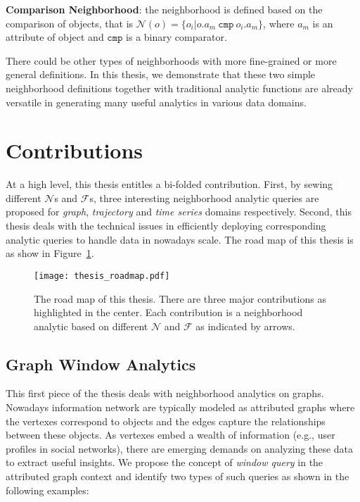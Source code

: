 \textbf{Comparison Neighborhood}: the neighborhood is defined based on the comparison of objects, that is $\mathcal{N}(o) = \{o_i | o.a_m \ \mathtt{cmp} \ o_i.a_m\}$, where $a_m$ is an attribute of object
and $\mathtt{cmp}$ is a binary comparator.

There could be other types of neighborhoods with more fine-grained or more general definitions. In this thesis, we demonstrate
that these two simple neighborhood definitions
together with traditional analytic functions are already versatile in generating many useful analytics in various data domains.

\section{Contributions}
At a high level, this thesis entitles a bi-folded contribution.
First, by
sewing different $\mathcal{N}$s and $\mathcal{F}$s, three interesting
neighborhood analytic queries are proposed for \emph{graph}, \emph{trajectory}
and \emph{time series} domains respectively. Second, this thesis
deals with the technical issues in efficiently deploying corresponding analytic queries to
handle data in nowadays scale.
The road map of this thesis is as show in Figure~\ref{fig:thesis_roadmap}.
\begin{figure}[h]
\centering
\texttt{[image: thesis\_roadmap.pdf]}
\caption{The road map of this thesis. There are three major contributions as highlighted in the center. Each contribution
is a neighborhood analytic based on different $\mathcal{N}$ and $\mathcal{F}$ as indicated by arrows.} 
\label{fig:thesis_roadmap}
\end{figure}

\subsection{Graph Window Analytics}
This first piece of the thesis deals with neighborhood analytics
on graphs. Nowadays information network are typically
modeled as attributed graphs where the 
vertexes correspond to objects and the edges capture the
relationships between these objects. As vertexes embed a wealth
of information (e.g., user profiles in social networks), there are 
emerging demands on analyzing these data to extract useful insights. We propose the concept of \emph{window query} in the attributed graph context and identify two types of such queries as shown in the following examples:

